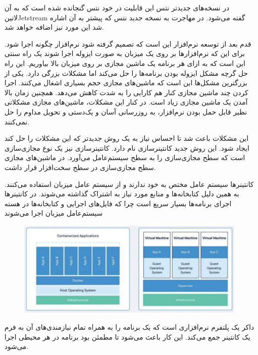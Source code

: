 \documentclass[a4]{report}
\begin{document}
در نسخه‌های جدیدتر نتس این قابلیت در خود نتس گنجانده شده است که به آن ‌لاتین{Jetstream} گفته می‌شود. در مهاجرت به نسخه جدید نتس که پیشتر به آن اشاره شد این مورد نیز اضافه خواهد شد.
\vspace{2cm}

قدم بعد از توسعه نرم‌افزار این است که تصمیم گرفته شود نرم‌افزار چگونه اجرا شود. برای این که نرم‌افزارها بر روی یک میزبان به صورت ایزوله اجرا شوند یک راه سنتی این است که به ازای هر برنامه یک ماشین مجازی
بر روی میزبان بالا بیاوریم. این راه حل گرچه مشکل ایزوله بودن برنامه‌ها را حل می‌کند اما مشکلات بزرگی دارد.
یکی از بزرگترین مشکل‌ها این است که ماشین‌های مجازی حجم بسیاری اشغال می‌کنند. اجرا کردن چند ماشین
مجازی کنار هم کارایی را به شدت کاهش می‌دهد. همچنین زمان بالا آمدن یک ماشین مجازی زیاد است. در کنار این مشکلات، ماشین‌های مجازی مشکلاتی نظیر قابل حمل بودن نرم‌افزار، به روز‌رسانی آسان و یک‌دستی و تحویل مداوم را حل نمی‌کنند.

این مشکلات باعث شد تا احساس نیاز به یک روش جدیدتر که این مشکلات را حل کند ایجاد شود. این روش جدید کانتینرسازی نام دارد. کانتینرسازی نیز یک نوع مجازی‌سازی است که سطح مجازی‌سازی را به سطح سیستم‌عامل می‌آورد. در ماشین‌های مجازی سطح مجازی‌سازی در سطح سخت‌افزار قرار داشت.

کانتینرها سیستم عامل مختص به خود ندارند و از سیستم عامل میزبان استفاده می‌کنند. به همین دلیل
کتابخانه‌ها و منابع مورد نیاز به اشتراک گذاشته می‌شوند. در کانتینرها اجرای برنامه‌ها بسیار سریع است چرا که
فایل‌های اجرایی و کتابخانه‌ها در هسته سیستم‌عامل میزبان اجرا می‌شوند

\begin{figure}
\centering
\includegraphics[scale=0.25]{fig/vm}
\end{figure}

داکر یک پلتفرم نرم‌افزاری است که یک برنامه را به همراه تمام نیازمندی‌های آن به فرم یک کانتینر جمع
می‌کند. این کار باعث می‌شود تا مطمئن بود برنامه در هر محیطی اجرا می‌شود.
\end{document}
